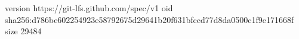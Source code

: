 version https://git-lfs.github.com/spec/v1
oid sha256:d786be602254923e58792675d29641b20f631bfccd77d8da0500c1f9e171668f
size 29484

